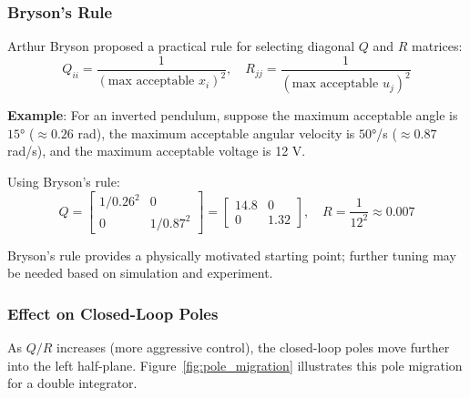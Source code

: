 \subsubsection{Bryson's Rule}

Arthur Bryson proposed a practical rule for selecting diagonal $Q$ and $R$ matrices:
\begin{equation}
\boxed{Q_{ii} = \frac{1}{(\text{max acceptable } x_i)^2}, \quad R_{jj} = \frac{1}{(\text{max acceptable } u_j)^2}}
\label{eq:bryson}
\end{equation}

\textbf{Example}: For an inverted pendulum, suppose the maximum acceptable angle is $15°$ ($\approx 0.26$ rad), the maximum acceptable angular velocity is $50°$/s ($\approx 0.87$ rad/s), and the maximum acceptable voltage is 12 V.

Using Bryson's rule:
\begin{equation}
Q = \begin{bmatrix} 1/0.26^2 & 0 \\ 0 & 1/0.87^2 \end{bmatrix} = \begin{bmatrix} 14.8 & 0 \\ 0 & 1.32 \end{bmatrix}, \quad R = \frac{1}{12^2} \approx 0.007
\end{equation}

Bryson's rule provides a physically motivated starting point; further tuning may be needed based on simulation and experiment.

\subsubsection{Effect on Closed-Loop Poles}

As $Q/R$ increases (more aggressive control), the closed-loop poles move further into the left half-plane. Figure~\ref{fig:pole_migration} illustrates this pole migration for a double integrator.

